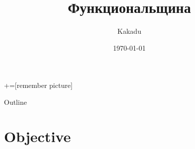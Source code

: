 \documentclass{beamer}
\title[Part of thesis title]{Функциональщина}
\author{Kakadu}
\institute{St Petersburg University}
\date{\today}
\begin{document}
\maketitle

\begin{comment}
:Title: Beamer arrows
:Tags: Remember picture, Beamer, Physics & chemistry, Overlays
:Use page: 3

With PGF/TikZ version 1.09 and later, it is possible to draw paths between nodes across
different pictures. This is a useful feature for presentations with the
Beamer package. In this example I've combined the new PGF/TikZ's overlay feature
with Beamer overlays. Download the PDF version to see the result.

**Note.** This only works with PDFTeX, and you have to run PDFTeX twice.

| Author: Kjell Magne Fauske

\end{comment}


+=[remember picture]

\everymath{\displaystyle}


\begin{frame}
  \titlepage
\end{frame}

\begin{frame}{Outline}
  \tableofcontents
\end{frame}


\section{Objective}
\end{document}
